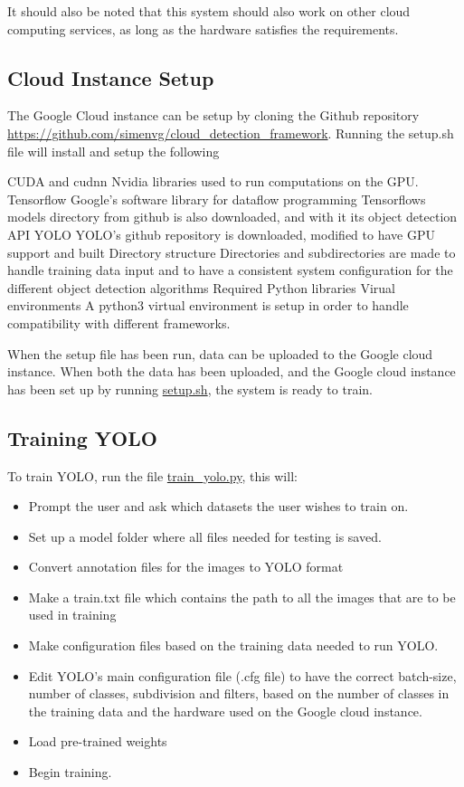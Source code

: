 \vspace{3mm}

It should also be noted that this system should also work on other cloud computing services, as long as the hardware satisfies the requirements. 

\subsection{Cloud Instance Setup}
The Google Cloud instance can be setup by cloning the Github repository \url{https://github.com/simenvg/cloud_detection_framework}. Running the setup.sh file will install and setup the following 

\begin{outline}
    \1 CUDA and cudnn
       \2 Nvidia libraries used to run computations on the GPU. 
    \1 Tensorflow
       \2 Google's software library for dataflow programming
       \2 Tensorflows models directory from github is also downloaded, and with it its object detection API
    \1 YOLO
       \2 YOLO's github repository is downloaded, modified to have GPU support and built
    \1 Directory structure
       \2 Directories and subdirectories are made to handle training data input and to have a consistent system configuration for the different object detection algorithms
    \1 Required Python libraries
    \1 Virual environments
       \2 A python3 virtual environment is setup in order to handle compatibility with different frameworks.
\end{outline}



When the setup file has been run, data can be uploaded to the Google cloud instance. When both the data has been uploaded, and the Google cloud instance has been set up by running \url{setup.sh}, the system is ready to train.

\subsection{Training YOLO}
To train YOLO, run the file \url{train_yolo.py}, this will:

\begin{itemize}
    \item Prompt the user and ask which datasets the user wishes to train on.
    \item Set up a model folder where all files needed for testing is saved.
    \item Convert annotation files for the images to YOLO format
    \item Make a train.txt file which contains the path to all the images that are to be used in training
    \item Make configuration files based on the training data needed to run YOLO.
    \item Edit YOLO's main configuration file (.cfg file) to have the correct batch-size, number of classes, subdivision and filters, based on the number of classes in the training data and the hardware used on the Google cloud instance.
    \item Load pre-trained weights
    \item Begin training.
\end{itemize}

